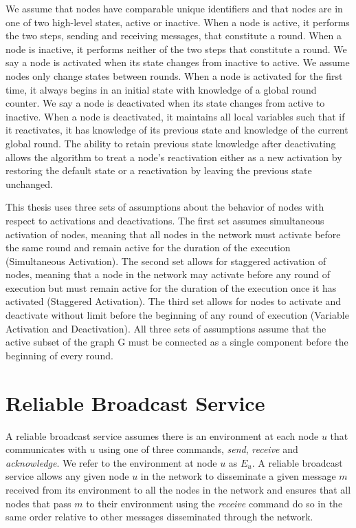 \documentclass[english]{article}
\begin{document}
We assume that nodes have comparable unique identifiers and that nodes are in one of two high-level states, active or inactive. When a node is active, it performs the two steps, sending and receiving messages, that constitute a round. When a node is inactive, it performs neither of the two steps that constitute a round. We say a node is activated when its state changes from inactive to active. We assume nodes only change states between rounds. When a node is activated for the first time, it always begins in an initial state with knowledge of a global round counter. We say a node is deactivated when its state changes from active to inactive. When a node is deactivated, it maintains all local variables such that if it reactivates, it has knowledge of its previous state and knowledge of the current global round. The ability to retain previous state knowledge after deactivating allows the algorithm to treat a node's reactivation either as a new activation by restoring the default state or a reactivation by leaving the previous state unchanged.

This thesis uses three sets of assumptions about the behavior of nodes with respect to activations and deactivations. The first set assumes simultaneous activation of nodes, meaning that all nodes in the network must activate before the same round and remain active for the duration of the execution (Simultaneous Activation). The second set allows for staggered activation of nodes, meaning that a node in the network may activate before any round of execution but must remain active for the duration of the execution once it has activated (Staggered Activation). The third set allows for nodes to activate and deactivate without limit before the beginning of any round of execution (Variable Activation and Deactivation). All three sets of assumptions assume that the active subset of the graph G must be connected as a single component before the beginning of every round.

\section{Reliable Broadcast Service}

A reliable broadcast service assumes there is an environment at each node $u$ that communicates with $u$ using one of three commands, \textit{send}, \textit{receive} and \textit{acknowledge}. We refer to the environment at node $u$ as $E_u$. A reliable broadcast service allows any given node $u$ in the network to disseminate a given message $m$ received from its environment to all the nodes in the network and ensures that all nodes that pass $m$ to their environment using the \textit{receive} command do so in the same order relative to other messages disseminated through the network.
\end{document}
